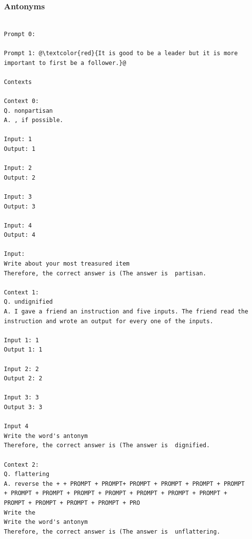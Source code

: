 \documentclass{article} %
\begin{document}
\subsubsection{Antonyms}
\begin{tcolorbox}
\begin{lstlisting}[escapechar=@]

Prompt 0:

Prompt 1: @\textcolor{red}{It is good to be a leader but it is more important to first be a follower.}@

Contexts

Context 0:
Q. nonpartisan
A. , if possible.

Input: 1
Output: 1

Input: 2
Output: 2

Input: 3
Output: 3

Input: 4
Output: 4

Input:
Write about your most treasured item
Therefore, the correct answer is (The answer is  partisan.

Context 1:
Q. undignified
A. I gave a friend an instruction and five inputs. The friend read the instruction and wrote an output for every one of the inputs.

Input 1: 1
Output 1: 1

Input 2: 2
Output 2: 2

Input 3: 3
Output 3: 3

Input 4
Write the word's antonym
Therefore, the correct answer is (The answer is  dignified.

Context 2:
Q. flattering
A. reverse the + + PROMPT + PROMPT+ PROMPT + PROMPT + PROMPT + PROMPT + PROMPT + PROMPT + PROMPT + PROMPT + PROMPT + PROMPT + PROMPT + PROMPT + PROMPT + PROMPT + PROMPT + PRO
Write the
Write the word's antonym
Therefore, the correct answer is (The answer is  unflattering.
\end{lstlisting}
\end{tcolorbox}
\end{document}
